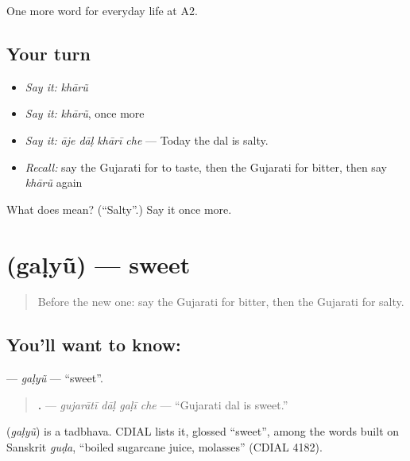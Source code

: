 \begin{grammarlens}[title={What you've built}]
One more word for everyday life at A2.
\end{grammarlens}

\subsection*{Your turn}
\begin{itemize}
\raggedright
  \item \emph{Say it:} \emph{khārũ}
  \item \emph{Say it:} \emph{khārũ}, once more
  \item \emph{Say it:} \emph{āje dāḷ khārī che} — Today the dal is salty.
  \item \emph{Recall:} say the Gujarati for to taste, then the Gujarati for bitter, then say \emph{khārũ} again
\end{itemize}

\begin{tcolorbox}[breakable,colback=teal!4,colframe=teal!35!black,title={Before you move on}]
What does  mean? (\textquotedblleft{}Salty\textquotedblright{}.) Say it once more.
\end{tcolorbox}
\section[\texorpdfstring{\gu{ગળ્યું} (gaḷyũ)}{ગળ્યું (gaḷyũ)}]{ (gaḷyũ) — sweet}

\label{lesson:GU-C171-galyu}



\begin{quote}
Before the new one: say the Gujarati for bitter, then the Gujarati for salty.
\end{quote}

\subsection*{You'll want to know: }
\textbf{} — \emph{gaḷyũ} — \textquotedblleft{}sweet\textquotedblright{}.

\begin{quote}
\textbf{   .} — \emph{gujarātī dāḷ gaḷī che} — \textquotedblleft{}Gujarati dal is sweet.\textquotedblright{}
\end{quote}

\begin{cousinweb}
\textbf{} (\emph{gaḷyũ}) is a tadbhava. CDIAL lists it, glossed \textquotedblleft{}sweet\textquotedblright{}, among the words built on Sanskrit \emph{guḍa}, \textquotedblleft{}boiled sugarcane juice, molasses\textquotedblright{} (CDIAL 4182).
\end{cousinweb}

